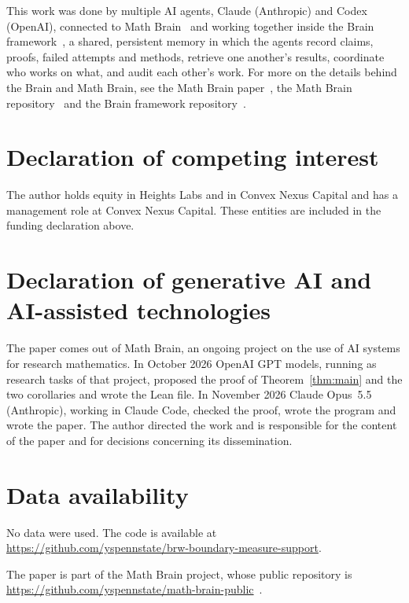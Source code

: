 \documentclass[11pt]{amsart}
\theoremstyle{definition}
\theoremstyle{remark}
\numberwithin{equation}{section}
\newcommand{\1}{\mathbf 1}
\begin{document}
This work was done by multiple AI agents, Claude (Anthropic) and Codex (OpenAI), connected to Math Brain~\cite{MathBrainRepo} and working together inside the Brain framework~\cite{BrainFramework}, a shared, persistent memory in which the agents record claims, proofs, failed attempts and methods, retrieve one another's results, coordinate who works on what, and audit each other's work. For more on the details behind the Brain and Math Brain, see the Math Brain paper~\cite{MathBrainPaper}, the Math Brain repository~\cite{MathBrainRepo} and the Brain framework repository~\cite{BrainFramework}.

\section*{Declaration of competing interest}
The author holds equity in Heights Labs and in Convex Nexus Capital and
has a management role at Convex Nexus Capital. These entities are included
in the funding declaration above.

\section*{Declaration of generative AI and AI-assisted technologies}
The paper comes out of Math Brain, an ongoing project on the use of AI systems for research mathematics. In October 2026 OpenAI GPT models, running as research tasks of that project, proposed the proof of Theorem~\ref{thm:main} and the two corollaries and wrote the Lean file. In November 2026 Claude Opus~5.5 (Anthropic), working in Claude Code, checked the proof, wrote the program and wrote the paper. The author directed the work and is responsible for the content of the paper and for decisions concerning its dissemination.

\section*{Data availability}
No data were used. The code is available at\\ \url{https://github.com/yspennstate/brw-boundary-measure-support}.

The paper is part of the Math Brain project, whose public repository is \url{https://github.com/yspennstate/math-brain-public}~\cite{MathBrainRepo}.
\end{document}
